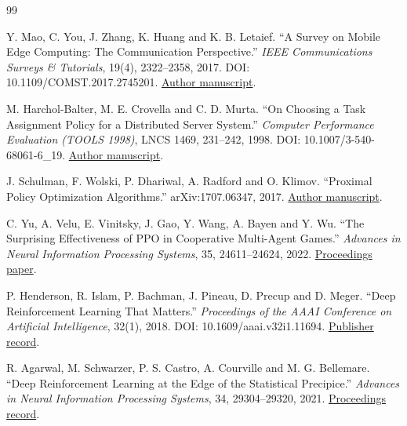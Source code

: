 \documentclass[11pt,a4paper]{article}
\begin{document}
\begin{thebibliography}{99}

 Y. Mao, C. You, J. Zhang, K. Huang and K. B. Letaief. ``A Survey on Mobile Edge Computing: The Communication Perspective.'' \emph{IEEE Communications Surveys \& Tutorials}, 19(4), 2322--2358, 2017. DOI: 10.1109/COMST.2017.2745201. \href{\detokenize{https://arxiv.org/abs/1701.01090}}{Author manuscript}.

 M. Harchol-Balter, M. E. Crovella and C. D. Murta. ``On Choosing a Task Assignment Policy for a Distributed Server System.'' \emph{Computer Performance Evaluation (TOOLS 1998)}, LNCS 1469, 231--242, 1998. DOI: 10.1007/3-540-68061-6\_19. \href{\detokenize{https://www.cs.cmu.edu/~harchol/Papers/tools.pdf}}{Author manuscript}.

 J. Schulman, F. Wolski, P. Dhariwal, A. Radford and O. Klimov. ``Proximal Policy Optimization Algorithms.'' arXiv:1707.06347, 2017. \href{\detokenize{https://arxiv.org/abs/1707.06347}}{Author manuscript}.

 C. Yu, A. Velu, E. Vinitsky, J. Gao, Y. Wang, A. Bayen and Y. Wu. ``The Surprising Effectiveness of PPO in Cooperative Multi-Agent Games.'' \emph{Advances in Neural Information Processing Systems}, 35, 24611--24624, 2022. \href{\detokenize{https://papers.nips.cc/paper/2022/file/9c1535a02f0ce079433344e14d910597-Paper-Datasets_and_Benchmarks.pdf}}{Proceedings paper}.

 P. Henderson, R. Islam, P. Bachman, J. Pineau, D. Precup and D. Meger. ``Deep Reinforcement Learning That Matters.'' \emph{Proceedings of the AAAI Conference on Artificial Intelligence}, 32(1), 2018. DOI: 10.1609/aaai.v32i1.11694. \href{\detokenize{https://ojs.aaai.org/index.php/AAAI/article/view/11694}}{Publisher record}.

 R. Agarwal, M. Schwarzer, P. S. Castro, A. Courville and M. G. Bellemare. ``Deep Reinforcement Learning at the Edge of the Statistical Precipice.'' \emph{Advances in Neural Information Processing Systems}, 34, 29304--29320, 2021. \href{\detokenize{https://proceedings.neurips.cc/paper/2021/hash/f514cec81cb148559cf475e7426eed5e-Abstract.html}}{Proceedings record}.


\end{thebibliography}
\end{document}
